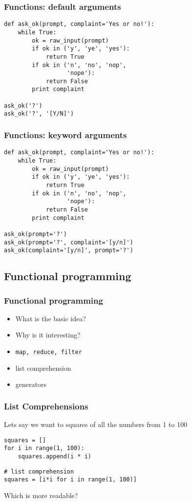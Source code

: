 \documentclass[14pt,compress]{beamer}
\newcounter{time}
\newcommand{\inctime}[1]{\addtocounter{time}{#1}{\tiny \thetime\ m}}
\newcommand{\typ}[1]{\texttt{#1}}
\begin{document}
\begin{frame}[fragile]
  \frametitle{Functions: default arguments}
  \small
  \begin{lstlisting}
def ask_ok(prompt, complaint='Yes or no!'):
    while True:
        ok = raw_input(prompt)
        if ok in ('y', 'ye', 'yes'): 
            return True
        if ok in ('n', 'no', 'nop',
                  'nope'): 
            return False
        print complaint

ask_ok('?')
ask_ok('?', '[Y/N]')
  \end{lstlisting}
\end{frame}

\begin{frame}[fragile]
  \frametitle{Functions: keyword arguments}
  \small
  \begin{lstlisting}
def ask_ok(prompt, complaint='Yes or no!'):
    while True:
        ok = raw_input(prompt)
        if ok in ('y', 'ye', 'yes'): 
            return True
        if ok in ('n', 'no', 'nop',
                  'nope'): 
            return False
        print complaint

ask_ok(prompt='?')
ask_ok(prompt='?', complaint='[y/n]')
ask_ok(complaint='[y/n]', prompt='?')
\end{lstlisting}
\inctime{15} 
\end{frame}

\subsection{Functional programming}
\begin{frame}[fragile]
    \frametitle{Functional programming}
    \begin{itemize}
      \item What is the basic idea?
      \item Why is it interesting?
      \item \typ{map, reduce, filter}
      \item list comprehension
      \item generators
    \end{itemize}
\end{frame}

\begin{frame}[fragile]
    \frametitle{List Comprehensions}
Lets say we want to squares of all the numbers from 1 to 100
    \begin{lstlisting}
squares = []
for i in range(1, 100):
    squares.append(i * i)
    \end{lstlisting}
    \begin{lstlisting}
# list comprehension
squares = [i*i for i in range(1, 100)]
     \end{lstlisting}
Which is more readable?
\end{frame}
\end{document}
